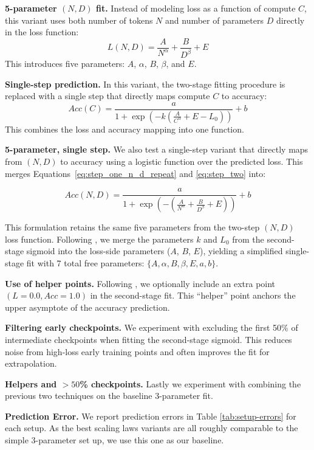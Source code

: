 \documentclass{article}
\theoremstyle{plain}
\theoremstyle{definition}
\theoremstyle{remark}
\begin{document}
\textbf{5-parameter $(N,D)$ fit.}  
Instead of modeling loss as a function of compute $C$, this variant uses both number of tokens $N$ and number of parameters $D$ directly in the loss function:
\begin{equation}
\label{eq:step_one_n_d_repeat}
L(N,D)=\frac{A}{N^\alpha}+\frac{B}{D^\beta}+E
\end{equation}
This introduces five parameters: $A$, $\alpha$, $B$, $\beta$, and $E$.

\textbf{Single-step prediction.}  
In this variant, the two-stage fitting procedure is replaced with a single step that directly maps compute $C$ to accuracy:
\begin{equation}
\label{eq:combined_repeat}
Acc(C) = \frac{a}{1 + \exp\left(-k \left(\frac{A}{C^\alpha} + E - L_0\right)\right)} + b
\end{equation}
This combines the loss and accuracy mapping into one function.

\textbf{5-parameter, single step.}  
We also test a single-step variant that directly maps from $(N, D)$ to accuracy using a logistic function over the predicted loss. This merges Equations~\ref{eq:step_one_n_d_repeat} and \ref{eq:step_two} into:

\begin{equation}
\label{eq:combined_5param}
Acc(N,D) = \frac{a}{1 + \exp\left( -\left( \frac{A}{N^\alpha} + \frac{B}{D^\beta} + E \right) \right)} + b
\end{equation}

This formulation retains the same five parameters from the two-step $(N, D)$ loss function. Following \citet{bhagia2024establishingtaskscalinglaws}, we merge the parameters $k$ and $L_0$ from the second-stage sigmoid into the loss-side parameters ($A$, $B$, $E$), yielding a simplified single-stage fit with 7 total free parameters: $\{A, \alpha, B, \beta, E, a, b\}$.

\textbf{Use of helper points.}  
Following \citet{bhagia2024establishingtaskscalinglaws}, we optionally include an extra point $(L = 0.0, Acc = 1.0)$ in the second-stage fit. This “helper” point anchors the upper asymptote of the accuracy prediction.

\textbf{Filtering early checkpoints.}  
We experiment with excluding the first 50\% of intermediate checkpoints when fitting the second-stage sigmoid. This reduces noise from high-loss early training points and often improves the fit for extrapolation.

\textbf{Helpers and $>50$\% checkpoints.}
Lastly we experiment with combining the previous two techniques on the baseline 3-parameter fit.


\textbf{Prediction Error.} We report prediction errors in Table \ref{tab:setup-errors} for each setup. As the best scaling laws variants are all roughly comparable to the simple 3-parameter set up, we use this one as our baseline.
\end{document}
